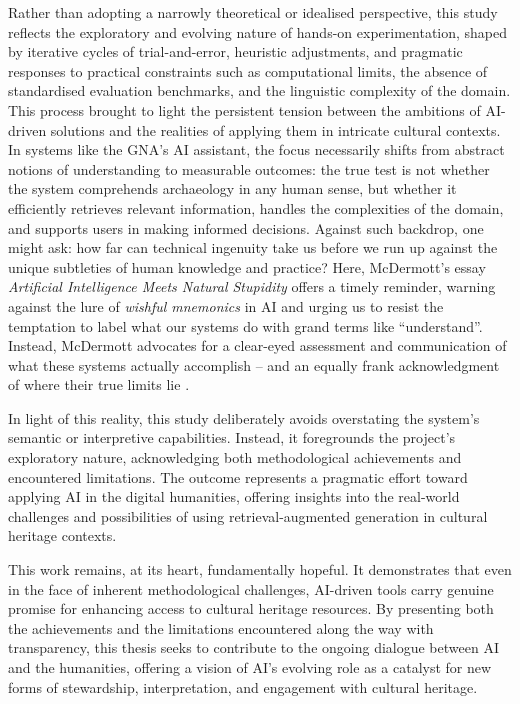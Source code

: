 \begin{spacing}{1.5}
Rather than adopting a narrowly theoretical or idealised perspective, this study reflects the exploratory and evolving nature of hands-on experimentation, shaped by iterative cycles of trial-and-error, heuristic adjustments, and pragmatic responses to practical constraints such as computational limits, the absence of standardised evaluation benchmarks, and the linguistic complexity of the domain. This process brought to light the persistent tension between the ambitions of AI-driven solutions and the realities of applying them in intricate cultural contexts. In systems like the GNA’s AI assistant, the focus necessarily shifts from abstract notions of understanding to measurable outcomes: the true test is not whether the system comprehends archaeology in any human sense, but whether it efficiently retrieves relevant information, handles the complexities of the domain, and supports users in making informed decisions. Against such backdrop, one might ask: how far can technical ingenuity take us before we run up against the unique subtleties of human knowledge and practice? Here, McDermott’s essay \textit{Artificial Intelligence Meets Natural Stupidity} offers a timely reminder, warning against the lure of \textit{wishful mnemonics} in AI and urging us to resist the temptation to label what our systems do with grand terms like “understand”. Instead, McDermott advocates for a clear-eyed assessment and communication of what these systems actually accomplish -- and an equally frank acknowledgment of where their true limits lie \citep{mcdermott_artificial_1976}.

In light of this reality, this study deliberately avoids overstating the system’s semantic or interpretive capabilities. Instead, it foregrounds the project’s exploratory nature, acknowledging both methodological achievements and encountered limitations. The outcome represents a pragmatic effort toward applying AI in the digital humanities, offering insights into the real-world challenges and possibilities of using retrieval-augmented generation in cultural heritage contexts.

This work remains, at its heart, fundamentally hopeful. It demonstrates that even in the face of inherent methodological challenges, AI-driven tools carry genuine promise for enhancing access to cultural heritage resources. By presenting both the achievements and the limitations encountered along the way with transparency, this thesis seeks to contribute to the ongoing dialogue between AI and the humanities, offering a vision of AI’s evolving role as a catalyst for new forms of stewardship, interpretation, and engagement with cultural heritage.

\end{spacing}